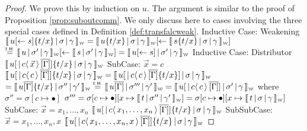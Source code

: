 \documentclass[a4paper,UKenglish,cleveref, autoref]{lipics-v2019}
\newcommand{\share}[3]{#1 [#2 \leftarrow #3]}
\newcommand{\dist}[5]{#1 [ #2 \, \vert \, \fakedist{#4}{#5} \, #3 ]}
\newcommand{\fakedist}[2]{#1 \langle \, #2 \, \rangle}
\newcommand{\sub}[3]{#1 \{ #2 / #3 \}}
\newcommand{\weaksymbol}{\mbox{\tiny $\mathcal{W}$}}
\newcommand{\readweakwmap}[3]{\llbracket \, #1 \, \vert \, #2 \, \vert \, #3  \, \rrbracket_{\weaksymbol} }
\newcommand{\IH}{\stackrel{\hbox{\tiny I.H.}}{\hbox{=}}}
\begin{document}
\begin{proof}
We prove this by induction on $u$. The argument is similar to the proof of Proposition \ref{prop:suboutcomm}. We only discuss here to cases involving the three special cases defined in Definition \ref{def:transfalcweak}.
\newline
\newline
Inductive Case: Weakening
\newline
$\readweakwmap{\share{u}{}{s} \sub{}{t}{x}}{\sigma}{\gamma} = \share{\readweakwmap{u \sub{}{t}{x}}{\sigma}{\gamma}}{}{\readweakwmap{s \sub{}{t}{x}}{\sigma}{\gamma}}$
\newline
$\IH \share{ \readweakwmap{u}{\sigma'}{\gamma}}{}{ \readweakwmap{s}{\sigma'}{\gamma}} =  \readweakwmap{\share{u}{}{s}}{\sigma'}{\gamma}$
\newline
\newline
Inductive Case: Distributor
\newline
$\readweakwmap{\dist{u}{}{\overline{[\Gamma]}}{c}{\vec{x}} \sub{}{t}{x}}{\sigma}{\gamma}$
\newline
\newline
\indent SubCase: $\vec{x} = c$
\newline
$\readweakwmap{\dist{u}{}{\overline{[\Gamma]}}{c}{c} \sub{}{t}{x}}{\sigma}{\gamma} = \readweakwmap{\dist{u}{}{\overline{[\Gamma]} \sub{}{t}{x}}{c}{c} }{\sigma}{\gamma}$
\newline
$= \readweakwmap{u \overline{[\Gamma]} \sub{}{t}{x}}{\sigma''}{\gamma'} \IH \readweakwmap{u \overline{[\Gamma]}}{\sigma'''}{\gamma'} = \readweakwmap{\dist{u}{}{\overline{[\Gamma]}}{c}{c}}{\sigma'}{\gamma}$
\newline
where
\newline
$\sigma'' = \sigma[c \mapsto \bullet]$
\newline
$\sigma''' = \sigma [c \mapsto \bullet] [x \mapsto \readweakwmap{t}{\sigma''}{\gamma'}] = \sigma [c \mapsto \bullet][x \mapsto \readweakwmap{t}{\sigma}{\gamma}] $
\newline
\newline
\indent SubCase: $\vec{x} = x_{1}, \dots, x_{n}$
\newline
$\readweakwmap{\dist{u}{}{\overline{[\Gamma]}}{c}{x_{1}, \dots, x_{n}} \sub{}{t}{x}}{\sigma}{\gamma}$
\newline
\newline
\indent \indent SubSubCase: $\vec{x} = x_{1}, \dots, x_{n}, x$
\newline
$\readweakwmap{\dist{u}{}{\overline{[\Gamma]}}{c}{x_{1}, \dots, x_{n}, x} \sub{}{t}{x}}{\sigma}{\gamma}$

\end{proof}
\end{document}
